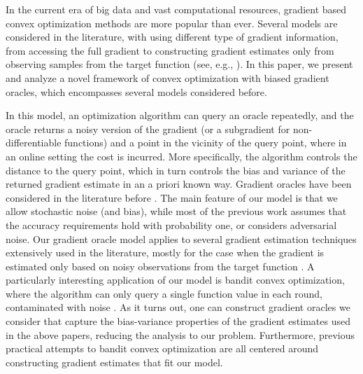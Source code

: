 In the current era of big data and vast computational resources, gradient based convex optimization methods are more popular than ever. Several models are considered in the literature, with using different type of gradient information, from accessing the full gradient to constructing gradient estimates only from observing samples from the target function (see, e.g., \citealp{nesterov2004introductory,DeGliNe14,HaLe14:SOC,PoTsy90,flaxman2005online,AbHaRa08,AgDeXi10,Ne11:TR,AgFoHsuKaRa13:SIAM,katkul,kushcla,spall1992multivariate,spall1997one,Dip03:AoS,bhatnagar-book,duchi2015optimal}). In this paper, we present and analyze a novel framework of convex optimization with biased gradient oracles, which encompasses several models considered before.

In this model, an optimization algorithm can query an oracle repeatedly, and the oracle returns a noisy version of the gradient (or a subgradient for non-differentiable functions) and a point in the vicinity of the query point, where in an online setting the cost is incurred. More specifically, the algorithm controls the distance to the query point, which in turn controls the bias and variance of the returned gradient estimate in an a priori known way. 
Gradient oracles have been considered in the literature before \citep{dAsp08,Baes09,SchRoBa11,DeGliNe14}. The main feature of our model is that we allow stochastic noise (and bias), while most of the previous work assumes that the accuracy requirements hold with probability one, or considers adversarial noise. Our gradient oracle model applies to several gradient estimation techniques extensively used in the literature, mostly for the case when the gradient is estimated only based on noisy observations from the target function \citep{katkul,kushcla,spall1992multivariate,spall1997one,Dip03:AoS,bhatnagar-book,duchi2015optimal}. A particularly interesting application of our model is bandit convex optimization, where the algorithm can only query a single function value in each round, contaminated with noise \citep{PoTsy90,flaxman2005online,AbHaRa08,AgDeXi10,Ne11:TR,AgFoHsuKaRa13:SIAM,HaLe14:SOC}. As it turns out, one can construct gradient oracles we consider that capture the bias-variance properties of the gradient estimates used in the above papers, reducing the analysis to our problem. Furthermore, previous practical attempts to bandit convex optimization are all centered around constructing gradient estimates that fit our model.

